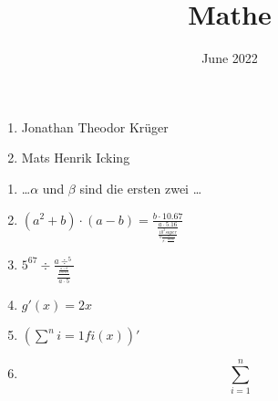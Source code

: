 \documentclass{article}
\title{Mathe}
\date{June 2022}
\begin{document}
\begin{enumerate}
    \item{Jonathan Theodor Krüger} 
    \item{Mats Henrik Icking}
\end{enumerate}


\maketitle


\begin{enumerate}
    \item \dots $\alpha$ und $\beta$ sind die ersten zwei \dots
    \item $(a^2 + b) \cdot (a - b) = \frac{b \cdot 10.67}{\frac{a \cdot 5.16}{\frac{10^3super}{b\frac{\alpha}{\beta \cdot \frac{Diesel}{}}}}}$
    \item $5^{67} \div \frac{a \div ^{5}}{\frac{\frac{\frac{a \div b}{Diesel}}{}}{a \cdot 5}}$
    \item $g\prime (x) = 2x$
    \item $(\sum ^n i=1 fi(x))\prime$
    \item$$\sum_{i=1}^{n} $$
    
\end{enumerate}
\end{document}
